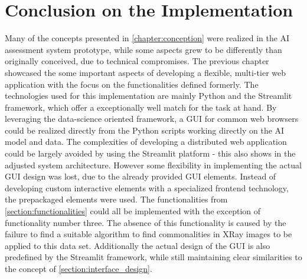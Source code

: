 \documentclass[11pt,a4paper,english]{scrreprt}
\begin{document}
\section{Conclusion on the Implementation}
Many of the concepts presented in \autoref{chapter:conception} were realized in the AI assessment system prototype, while some aspects grew to be differently than originally conceived, due to technical compromises. The previous chapter showcased the some important aspects of developing a flexible, multi-tier web application with the focus on the functionalities defined formerly. The technologies used for this implementation are mainly Python and the Streamlit framework, which offer a exceptionally well match for the task at hand. By leveraging the data-science oriented framework, a GUI for common web browsers could be realized directly from the Python scripts working directly on the AI model and data. The complexities of developing a distributed web application could be largely avoided by using the Streamlit platform - this also shows in the adjusted system architecture. However some flexibility in implementing the actual GUI design was lost, due to the already provided GUI elements. Instead of developing custom interactive elements with a specialized frontend technology, the prepackaged elements were used. The functionalities from \autoref{section:functionalities} could all be implemented with the exception of functionality number three. The absence of this functionality is caused by the failure to find a suitable algorithm to find commonalities in XRay images to be applied to this data set. Additionally the actual design of the GUI is also predefined by the Streamlit framework, while still maintaining clear similarities to the concept of \autoref{section:interface_design}.

\newpage
\end{document}
